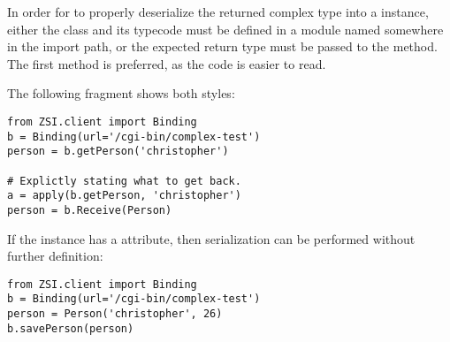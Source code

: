 In order for \ZSI{} to properly deserialize the returned complex type into
a  instance, either the class and its typecode must be defined
in a module named  somewhere in the import path,
or the expected return
type must be passed to the  method.
The first method is preferred, as the code is easier to read.

The following fragment shows both styles:

\begin{verbatim}
from ZSI.client import Binding
b = Binding(url='/cgi-bin/complex-test')
person = b.getPerson('christopher')

# Explictly stating what to get back.
a = apply(b.getPerson, 'christopher')
person = b.Receive(Person)
\end{verbatim}

If the instance has a  attribute, then serialization
can be performed without further definition:

\begin{verbatim}
from ZSI.client import Binding
b = Binding(url='/cgi-bin/complex-test')
person = Person('christopher', 26)
b.savePerson(person)
\end{verbatim}
